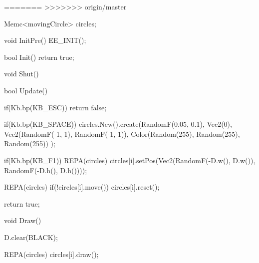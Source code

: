 =======
>>>>>>> origin/master
\begin{code}
Memc<movingCircle> circles;

void InitPre()
{
   EE_INIT();
}

bool Init()
{ 
   return true;
}

void Shut() {}

bool Update()
{
   if(Kb.bp(KB_ESC)) return false;
  
   if(Kb.bp(KB_SPACE))
   {
      circles.New().create(RandomF(0.05, 0.1), 
                           Vec2(0), 
                           Vec2(RandomF(-1, 1), RandomF(-1, 1)), 
                           Color(Random(255), Random(255), Random(255))
                           );
   }
   
   if(Kb.bp(KB_F1))
   {
      REPA(circles)
      {
         circles[i].setPos(Vec2(RandomF(-D.w(), D.w()), RandomF(-D.h(), D.h())));
      }
   }
   
   REPA(circles)
   {
      if(!circles[i].move()) circles[i].reset();
   }
   
   return true;
}

void Draw()
{
   D.clear(BLACK);
  
   REPA(circles)
   {
      circles[i].draw();
   }
}
\end{code}

